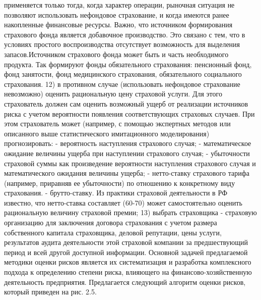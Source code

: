 применяется только тогда, когда характер операции, рыночная ситуация не позволяют
использовать нефондовое страхование, и когда имеются ранее накопленные финансовые
ресурсы. Важно, что источником формирования страхового фонда является добавочное
производство. Это связано с тем, что в условиях простого воспроизводства отсутствует
возможность для выделения запасов.Источником страхового фонда может быть и часть необходимого продукта. Так
формируют фонды обязательного страхования: пенсионный фонд, фонд занятости, фонд
медицинского страхования, обязательного социального страхования.
12) в противном случае (использовать нефондовое страхование невозможно)
оценить рациональную цену страховой услуги. Для этого страхователь должен сам
оценить возможный ущерб от реализации источников риска с учетом вероятности
появления соответствующих страховых случаев. При этом страхователь может (например,
с помощью экспертных методов или описанного выше статистического имитационного
моделирования) прогнозировать:
- вероятность наступления страхового случая;
- математическое ожидание величины ущерба при наступлении страхового случая;
- убыточности страховой суммы как произведение вероятности наступления
страхового случая и математического ожидания величины ущерба;
- нетто-ставку страхового тарифа (например, приравняв ее убыточности) по
отношению к конкретному виду страхования.
- брутто-ставку.
Из практики страховой деятельности в РФ известно, что нетто-ставка составляет
(60-70)%
может самостоятельно оценить рациональную величину страховой премии;
13) выбрать страховщика - страховую организацию для заключения договора
страхования с учетом размера собственного капитала страховщика, деловой репутации,
цены услуги, результатов аудита деятельности этой страховой компании за
предшествующий период и всей другой доступной информации.
Основной задачей предлагаемой методики оценки рисков является их
систематизация и разработка комплексного подхода к определению степени риска,
влияющего на финансово-хозяйственную деятельность предприятия. Предлагается
следующий алгоритм оценки рисков, который приведен на рис. 2.5.















